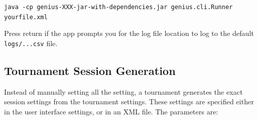 \documentclass[]{llncs}
\begin{document}
\vspace{0.5cm}
\verb|java -cp genius-XXX-jar-with-dependencies.jar genius.cli.Runner yourfile.xml|
\vspace{0.5cm}

Press return if the app prompts you for the log file location to log to  the default \verb|logs/...csv| file.

\subsection{Tournament Session Generation}\label{sec:sessiongeneration}
Instead of manually setting all the setting, a tournament generates the exact session settings from the tournament settings. These
settings are specified either in the user interface settings, or in an XML file. The parameters are:
\end{document}
